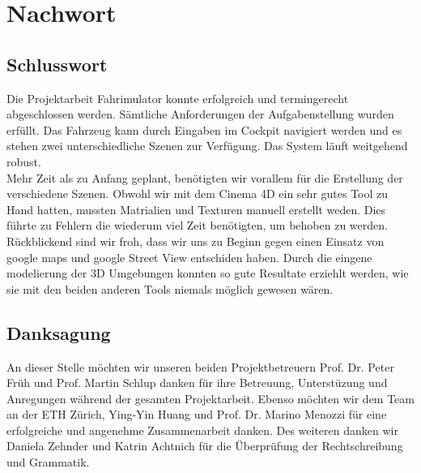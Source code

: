 \section{Nachwort}
\subsection{Schlusswort}
Die Projektarbeit Fahrimulator konnte erfolgreich und termingerecht abgeschlossen werden. Sämtliche Anforderungen der Aufgabenstellung wurden erfüllt. Das Fahrzeug kann durch Eingaben im Cockpit navigiert werden und es stehen zwei unterschiedliche Szenen zur Verfügung. Das System läuft weitgehend robust.\\
Mehr Zeit als zu Anfang geplant, benötigten wir vorallem für die Erstellung der verschiedene Szenen. Obwohl wir mit dem Cinema 4D ein sehr gutes Tool zu Hand hatten, mussten Matrialien und Texturen manuell erstellt weden. Dies führte zu Fehlern die wiederum viel Zeit benötigten, um behoben zu werden.\\
Rückblickend sind wir froh, dass wir uns zu Beginn gegen einen Einsatz von google maps und google Street View entschiden haben. Durch die eingene modelierung der 3D Umgebungen konnten so gute Resultate erziehlt werden, wie sie mit den beiden anderen Tools niemals möglich gewesen wären. 
\subsection{Danksagung}
An dieser Stelle möchten wir unseren beiden Projektbetreuern  Prof. Dr. Peter Früh und Prof. Martin Schlup danken für ihre Betreuung, Unterstüzung und Anregungen während der gesamten Projektarbeit. Ebenso möchten wir dem Team an der ETH Zürich, Ying-Yin Huang und Prof. Dr. Marino Menozzi für eine erfolgreiche und angenehme Zusammenarbeit danken. Des weiteren danken wir Daniela Zehnder und Katrin Achtnich für die Überprüfung der Rechtschreibung und Grammatik. 
